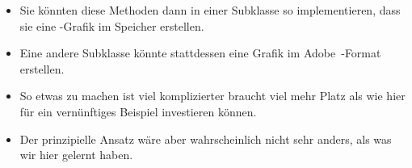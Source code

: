 \documentclass[aspectratio=169,mathserif,notheorems]{beamer}%
\begin{document}
\begin{frame}[t]
\begin{itemize}
%
\item<14-> Sie könnten diese Methoden dann in einer Subklasse so implementieren, dass sie eine -Grafik\cite{DDGLMSWFJJ2011SVGSSE} im Speicher erstellen.%
%
\item<15-> Eine andere Subklasse könnte stattdessen eine Grafik im Adobe~-Format\cite{A2024WDPM,A2008P3DMPDFP1P1} erstellen.%
%
\item<16-> So etwas zu machen ist viel komplizierter braucht viel mehr Platz als wie hier für ein vernünftiges Beispiel investieren können.%
%
\item<17-> Der prinzipielle Ansatz wäre aber wahrscheinlich nicht sehr anders, als was wir hier gelernt haben.%
\end{itemize}%
\end{frame}%
%
\endPresentation%
\end{document}
